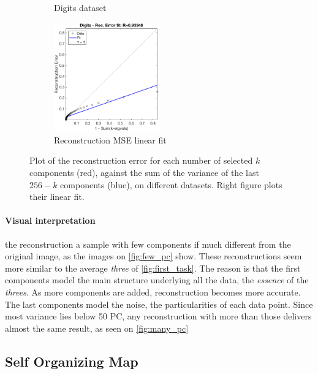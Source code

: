 \documentclass[a4paper, 10pt]{article}
\begin{document}
\begin{figure}[h]
\begin{adjustwidth}{-1cm}{-1cm}
\begin{subfigure}[t]{0.3\linewidth}
      \caption{Digits dataset}
      \label{fig:digits_rec}
    \end{subfigure}
    \begin{subfigure}[t]{0.3\linewidth}
      \includegraphics[width=1\linewidth, height=4.7cm]{./lab3/PCA/regression_digits.png}
      \caption{Reconstruction MSE linear fit}
      \label{fig:regression}
    \end{subfigure}
    \end{adjustwidth}
    \caption{Plot of the reconstruction error for each number of selected $k$ components (red),
    against the sum of the variance of the last $256-k$ components (blue), on 
  different datasets. Right figure plots their linear fit.}
    \label{fig:rec_vs_cumsum}
  \end{figure}
  

  \paragraph{Visual interpretation} the reconstruction a sample with few components 
  if much different from the original image, as the images on \autoref{fig:few_pc} 
  show. These reconstructions seem more similar to the average \emph{three} of 
  \autoref{fig:first_task}. The reason is that the first components model the
  main structure underlying all the data, the \emph{essence} of the \emph{threes}.
  As more components are added, reconstruction becomes more accurate.  The last 
  components model the noise, the particularities of each data point. Since
  most variance lies below 50 PC, any reconstruction with more than those delivers
  almost the same result, as seen on \autoref{fig:many_pc}
  





  \subsection{Self Organizing Map}
  \Blindtext
\end{document}
